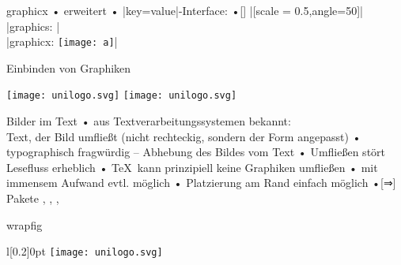 \begin{frame}[fragile]{graphicx}
•  erweitert 
• |key=value|-Interface:
•[] |[scale = 0.5,angle=50]|
\•
|graphics: \scalebox{0.5}{\texttt{[image: a]}}|\\
|graphicx: \texttt{[image: a]}|
\end{frame}

\begin{frame}[fragile]{Einbinden von Graphiken}
\begin{LTXexample}[pos=b,width=.9\textwidth]
\texttt{[image: unilogo.svg]}
\texttt{[image: unilogo.svg]}
\end{LTXexample}
\end{frame}



\begin{frame}[fragile]{Bilder im Text}
• aus Textverarbeitungssystemen bekannt:\\%
Text, der Bild umfließt (nicht rechteckig, sondern der Form angepasst)
• typographisch fragwürdig – Abhebung des Bildes vom Text
• Umfließen stört Lesefluss erheblich
• \TeX\ kann prinzipiell keine Graphiken umfließen
• mit immensem Aufwand evtl. möglich
• Platzierung am Rand einfach möglich
•[⇒] Pakete , , , 
\•
\end{frame}

\begin{frame}[fragile]{wrapfig}
\begin{LTXexample}[preset=\fontsize{4}{5}\selectfont,pos=b]
\blindtext
\begin{wrapfigure}{l}[0.2\width]{0pt}
\texttt{[image: unilogo.svg]}
\end{wrapfigure}
\blindtext[3]
\end{LTXexample}
\end{frame}

